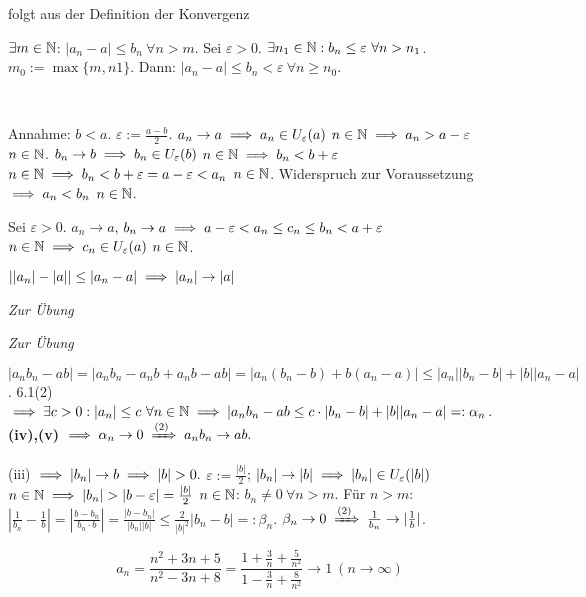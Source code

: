 \documentclass[a4paper,oneside,DIV15,BCOR12mm]{scrbook}
\begin{document}
\begin{beweise}
\item folgt aus der Definition der Konvergenz
\item $\exists m\in\mathbb{N}$: $|a_n - a| \le b_n\ \forall n>m$. Sei $\varepsilon >0$. $\exists n_1\in\MdN: b_n \le \varepsilon \ \forall n>n_1$. $m_0 := \max\{m,n1\}$. Dann: $|a_n - a| \le b_n < \varepsilon\ \forall n \ge n_0$.
\item \
\begin{liste}
\item Annahme: $b<a$. $\varepsilon := \frac{a-b}{2}$. $a_n \to a \implies a_n \in U_\varepsilon(a)$ \ffa $n\in\mathbb{N} \implies a_n > a- \varepsilon$ \ffa $n\in\mathbb{N}$. $b_n \to b \implies b_n \in U_\varepsilon(b)$ \ffa $n\in\mathbb{N} \implies b_n < b+\varepsilon$ \ffa $n\in\mathbb{N} \implies b_n < b + \varepsilon = a-\varepsilon < a_n$ \ffa $n\in\mathbb{N}$. Widerspruch zur Voraussetzung $\implies a_n < b_n$ \ffa $n\in\mathbb{N}$.
\item Sei $\varepsilon > 0$. $a_n \to a$, $b_n \to a \implies a-\varepsilon < a_n \le c_n \le b_n < a+\varepsilon$ \ffa $n\in\mathbb{N} \implies c_n \in U_\varepsilon(a)$ \ffa $n\in\mathbb{N}$.
\item $||a_n| - |a|| \le |a_n - a| \implies |a_n| \to |a|$
\item \textit{Zur Übung}
\item \textit{Zur Übung}
\item $|a_nb_n - ab| = |a_nb_n - a_nb + a_n b - ab| = |a_n(b_n-b)+ b(a_n-a)| \le |a_n||b_n - b|+|b||a_n-a|$. 6.1(2) $\folgt \exists c > 0: |a_n| \le c\ \forall n\in\MdN \folgt |a_nb_n-ab \le c\cdot|b_n-b| + |b||a_n-a| =: \alpha_n$. \textbf{(iv),(v)} $\folgt \alpha_n \to 0 \folgtnach{(2)} a_nb_n \to ab.$
\item (iii) $\folgt |b_n|\to b \folgt |b|>0.$ $\varepsilon := \frac{|b|}2$; $|b_n| \to |b| \implies |b_n| \in U_\varepsilon(|b|)$ \ffa $n\in\MdN \folgt |b_n|>|b-\varepsilon| = \frac{|b|}2$ \ffa $n\in\mathbb{N}$: $b_n \ne 0 \ \forall n>m$. Für $n>m$: $|\frac{1}{b_n} - \frac{1}{b}| = |\frac{b-b_n}{b_n\cdot b}| = \frac{|b-b_n|}{|b_n||b|} \le \frac{2}{|b|^2}|b_n-b| =: \beta_n$. $\beta_n \to 0 \folgtnach{(2)} \frac{1}{b_n} \to |\frac{1}{b}|$.
\end{liste}
\end{beweise}

\begin{beispiel}
$$ a_n = \frac{n^2+3n+5}{n^2-3n+8} = \frac{1 + \frac{3}n + \frac{5}{n^2}}{1-\frac{3}{n} + \frac{8}{n^2}} \to 1 \ (n\to\infty)$$
\end{beispiel}
\end{document}
